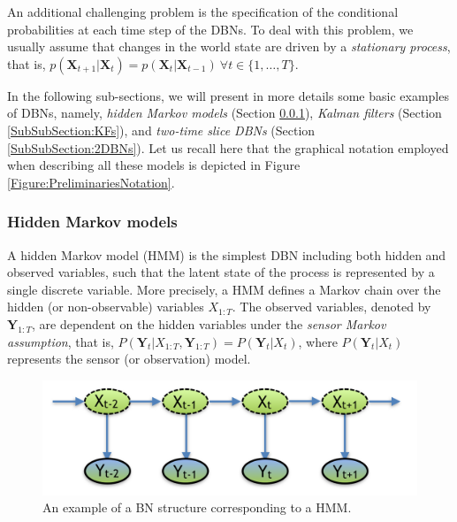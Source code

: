 An additional challenging problem is the specification of the conditional probabilities at each time step of the DBNs. To deal with this problem, we usually assume that changes in the world state are driven by a \textit{stationary process}, that is, $p(\bm X_{t+1}|\bm X_{t}) = p(\bm X_t|\bm X_{t-1})\ \forall t \in\{1,\ldots,T\}$. 

In the following sub-sections, we will present in more details some basic examples of DBNs, namely, \textit{hidden Markov models} (Section \ref{SubSubSection:HMMs}), \textit{Kalman filters} (Section \ref{SubSubSection:KFs}), and \textit{two-time slice DBNs} (Section \ref{SubSubSection:2DBNs}). Let us recall here that the graphical notation employed when describing all these models is depicted in Figure \ref{Figure:PreliminariesNotation}.

\subsubsection{Hidden Markov models}\label{SubSubSection:HMMs}

A hidden Markov model (HMM) is the simplest DBN including both hidden and observed variables, such that the latent state of the process is represented by a single discrete variable. More precisely, a HMM defines a Markov chain over the hidden (or non-observable) variables $X_{1:T}$. The observed variables, denoted by $\bm Y_{1:T}$, are dependent on the hidden variables under the \textit{sensor Markov assumption}, that is, $P(\bm Y_t| X_{1:T}, \bm Y_{1:T}) = P(\bm Y_t| X_t)$, where $P(\bm Y_t| X_t)$ represents the sensor (or observation) model.  

\begin{figure}[ht!]
\begin{center}
\includegraphics[scale=0.4]{./figures/PreliminariesHMM}
\caption{\label{Figure:HMM}An example of a BN structure corresponding to a HMM.}
\end{center}
\end{figure}

